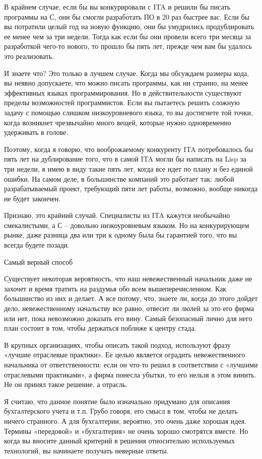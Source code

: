 \documentclass[ebook,12pt,oneside,openany]{memoir}
\begin{document}
В крайнем случае, если бы вы конкурировали с ITA и решили бы писать
программы на С, они бы смогли разработать ПО в 20 раз быстрее вас.
Если бы вы потратили целый год на новую функцию, они бы умудрились
продублировать ее менее чем за три недели. Тогда как если бы они
провели всего три месяца за разработкой чего-то нового, то прошло бы
пять лет, прежде чем вам бы удалось это реализовать.

И знаете что? Это только в лучшем случае. Когда мы обсуждаем размеры
кода, вы неявно допускаете, что можно писать программы, как ни
странно, на менее эффективных языках программирования. Но в
действительности существуют пределы возможностей программистов. Если
вы пытаетесь решить сложную задачу с помощью слишком низкоуровневого
языка, то вы достигнете той точки, когда возникнет чрезвычайно много
вещей, которые нужно одновременно удерживать в голове.

Поэтому, когда я говорю, что вооброжаемому конкуренту ITA
потребовалось бы пять лет на дублирование того, что в самой ITA могли
бы написать на Lisp за три недели, я имею в виду такие пять лет, когда
все идет по плану и без единой ошибки. На самом деле, в большинстве
компаний это работает так: любой разрабатываемый проект, требующий
пяти лет работы, возможно, вообще никогда не будет закончен.

Признаю, это крайний случай. Специалисты из ITA кажутся необычайно
смекалистыми, а С – довольно низкоуровневым языком. Но на
конкурирующем рынке, даже разница два или три к одному была бы
гарантией того, что вы всегда будете позади.

Самый верный способ

Существует некоторая вероятность, что наш невежественный начальник
даже не захочет и время тратить на раздумья обо всем
вышеперечисленном. Как большинство из них и делает. А все потому, что,
знаете ли, когда до этого дойдет дело, невежественному начальству все
равно, отвесит ли люлей за это его фирма или нет, пока невозможно
доказать его вину. Самый безопасный лично для него план состоит в том,
чтобы держаться поближе к центру стада.

В крупных организациях, чтобы описать такой подход, используют фразу
«лучшие отраслевые практики». Ее целью является оградить
невежественного начальника от ответственности: если он что-то решил в
соответствии с «лучшими отраслевыми практиками», а фирма понесла
убытки, то его нельзя в этом винить. Не он принял такое решение, а
отрасль.

Я считаю, что данное понятие было изначально придумано для описания
бухгалтерского учета и т.п. Грубо говоря, его смысл в том, чтобы не
делать ничего странного. А для бухгалтерии, вероятно, это очень даже
хорошая идея. Термины «передовой» и «бухгалтерия» не очень хорошо
смотрятся вместе. Но когда вы вносите данный критерий в решения
относительно используемых технологий, вы начинаете получать неверные
ответы.
\end{document}
